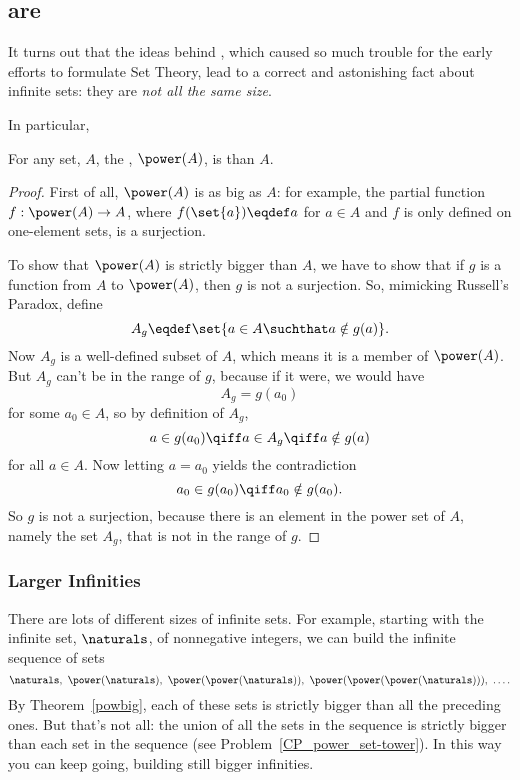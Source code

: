 \subsection{ are }

It turns out that the ideas behind , which caused
so much trouble for the early efforts to formulate Set Theory, lead to a
correct and astonishing fact about infinite sets: they are \emph{not all
  the same size}.

In particular,
\begin{theorem}\label{powbig}
For any set, $A$, the , $\power(A)$, is  than $A$.
\end{theorem}
\begin{proof}
  First of all, $\power(A)$ is as big as $A$: for example, the partial
  function $f:\power(A) \to A$, where $f(\set{a}) \eqdef a$ for $a \in A$
  and $f$ is only defined on one-element sets, is a surjection.

  To show that $\power(A)$ is strictly bigger than $A$, we have to show
  that if $g$ is a function from $A$ to $\power(A)$, then $g$ is not a
  surjection.  So, mimicking Russell's Paradox, define
  \[
  A_g \eqdef \set{a \in A \suchthat a \notin g(a)}.
  \]
  Now $A_g$ is a well-defined subset of $A$, which means it is a member of
  $\power(A)$.  But $A_g$ can't be in the range of $g$, because if it
  were, we would have
\[
A_g = g(a_0)
\]
for some $a_0 \in A$, so by definition of $A_g$,
\[
a \in g(a_0) \qiff a \in A_g \qiff a \notin g(a)
\]
for all $a \in A$.  Now letting $a = a_0$ yields the contradiction
\[
a_0 \in g(a_0) \qiff a_0 \notin g(a_0).
\]
So $g$ is not a surjection, because there is an element in the power set
of $A$, namely the set $A_g$, that is not in the range of $g$.
\end{proof}

\subsubsection{Larger Infinities}

There are lots of different sizes of infinite sets.  For example, starting
with the infinite set, $\naturals$, of nonnegative integers, we can build
the infinite sequence of sets
\[
\naturals,\ \power(\naturals),\ \power(\power(\naturals)),\
\power(\power(\power(\naturals))),\ \dots.
\]
By Theorem~\ref{powbig}, each of these sets is strictly bigger than all
the preceding ones.  But that's not all: the union of all the sets in the
sequence is strictly bigger than each set in the sequence
(see Problem~\ref{CP_power_set-tower}).  In this way you can keep going,
building still bigger infinities.

